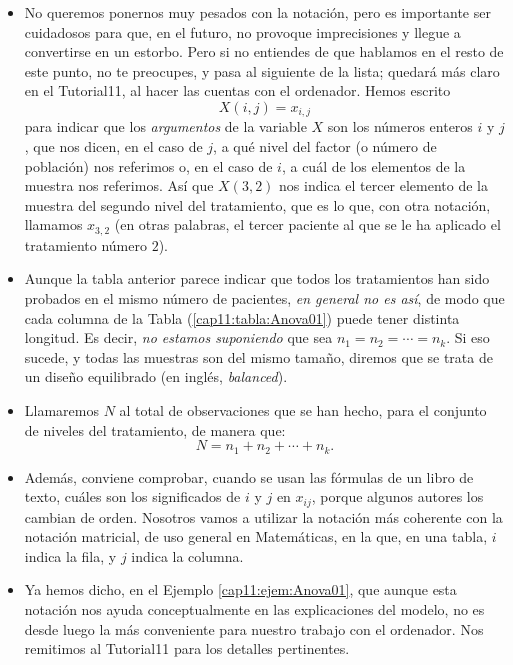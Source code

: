 \begin{itemize}
    \item No queremos ponernos muy pesados con la notación, pero es importante ser cuidadosos para que, en el futuro, no provoque imprecisiones y llegue a convertirse en un estorbo. Pero si no entiendes de que hablamos en el resto de este punto, no te preocupes, y pasa al siguiente de la lista; quedará más claro en el Tutorial11, al hacer las cuentas con el ordenador. Hemos escrito
        \[X(i,j)=x_{i,j}\]
        para indicar que los {\em argumentos} de la variable $X$ son los números enteros $i$ y $j$, que nos dicen, en el caso de $j$, a qué nivel del factor (o número de población) nos referimos o, en el caso de $i$, a cuál de los elementos de la muestra nos referimos. Así que $X(3,2)$ nos indica el tercer elemento de la muestra del segundo nivel del tratamiento, que es lo que, con otra notación, llamamos $x_{3,2}$ (en otras palabras, el tercer paciente al que se le ha aplicado el tratamiento número $2$).

  \item Aunque la tabla anterior parece indicar que todos los tratamientos han sido probados en el mismo número de pacientes, {\em en general no es así}, de modo que cada columna de la Tabla (\ref{cap11:tabla:Anova01}) puede tener distinta longitud. Es decir, {\em no estamos suponiendo} que sea $n_1=n_2=\cdots=n_k$. Si eso sucede, y todas las muestras son del mismo tamaño, diremos que se trata de un {\sf diseño equilibrado} (en inglés, {\em balanced}).

  \item Llamaremos $N$ al total de observaciones que se han hecho, para el conjunto de niveles del tratamiento, de manera que:
      \[N=n_1+n_2+\cdots+n_k.\]
  \item Además, conviene comprobar, cuando se usan las fórmulas de un libro de texto, cuáles son los significados de $i$ y $j$ en $x_{ij}$, porque algunos autores los cambian de orden. Nosotros vamos a utilizar la notación más coherente con la notación matricial, de uso general en Matemáticas, en la que, en una tabla, $i$ indica la fila, y $j$ indica la columna.
  \item Ya hemos dicho, en el Ejemplo \ref{cap11:ejem:Anova01}, que aunque esta notación nos ayuda conceptualmente en las explicaciones del modelo, no es desde luego la más conveniente para nuestro trabajo con el ordenador. Nos remitimos al Tutorial11 para los detalles pertinentes.
\end{itemize}


